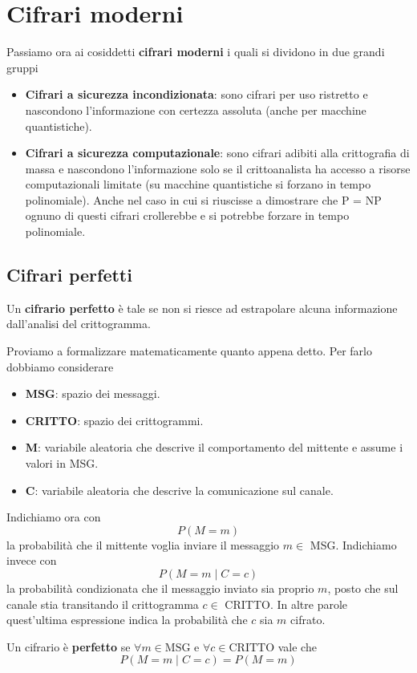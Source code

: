 \chapter{Cifrari moderni}\label{moderni}
Passiamo ora ai cosiddetti \textbf{cifrari moderni} i quali si dividono in due grandi gruppi
\begin{itemize}
	\item \textbf{Cifrari a sicurezza incondizionata}: sono cifrari per uso ristretto e nascondono l'informazione con
	      certezza assoluta (anche per macchine quantistiche).
	\item \textbf{Cifrari a sicurezza computazionale}: sono cifrari adibiti alla crittografia di massa e nascondono
	      l'informazione solo se il crittoanalista ha accesso a risorse computazionali limitate (su macchine quantistiche
	      si forzano in tempo polinomiale). Anche nel caso in cui si riuscisse a dimostrare che P = NP ognuno di questi
	      cifrari crollerebbe e si potrebbe forzare in tempo polinomiale.
\end{itemize}

\section{Cifrari perfetti}
Un \textbf{cifrario perfetto} \`e tale se non si riesce ad estrapolare alcuna informazione dall'analisi del crittogramma.

Proviamo a formalizzare matematicamente quanto appena detto. Per farlo dobbiamo considerare
\begin{itemize}
	\item \textbf{MSG}: spazio dei messaggi.
	\item \textbf{CRITTO}: spazio dei crittogrammi.
	\item \textbf{M}: variabile aleatoria che descrive il comportamento del	mittente e assume i valori in MSG.
	\item \textbf{C}: variabile aleatoria che descrive la comunicazione sul canale.
\end{itemize}
Indichiamo ora con
\[ P(M = m) \]
la probabilit\`a che il mittente voglia inviare il messaggio $m \in$ MSG. Indichiamo invece con
\[ P(M = m \mid C = c) \]
la probabilit\`a condizionata che il messaggio inviato sia proprio $m$, posto che sul canale stia transitando il
crittogramma $c \in$ CRITTO. In altre parole quest'ultima espressione indica la probabilit\`a che $c$ sia $m$ cifrato.

\begin{theorem}\label{th: cifrario_perfetto}
	Un cifrario \`e \textbf{perfetto} se $\forall m \in \text{MSG}$ e $\forall c \in \text{CRITTO}$ vale che
	\[ P(M = m \mid C = c) = P(M = m) \]
\end{theorem}

